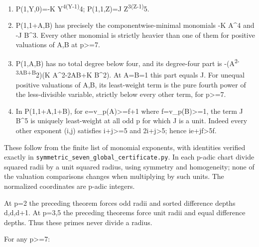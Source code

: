 \documentclass[
  10pt,
]{article}
\providecommand{\tightlist}{%
  \setlength{\itemsep}{0pt}\setlength{\parskip}{0pt}}
\begin{document}
\begin{enumerate}
\def\labelenumi{\arabic{enumi}.}
\tightlist
\item
  P(1,Y,0)=-K Y\textsuperscript{4(Y-1)}4; P(1,1,Z)=J
  Z\textsuperscript{3(Z-1)}5.
\item
  P(1,1+A,B) has precisely the componentwise-minimal monomials -K A\^{}4
  and -J B\^{}3. Every other monomial is strictly heavier than one of
  them for positive valuations of A,B at p\textgreater=7.
\item
  P(1,A,B) has no total degree below four, and its degree-four part is
  -(A\textsuperscript{2-3AB+B}2)(K A\^{}2-2AB+K B\^{}2). At A=B=1 this
  part equals J. For unequal positive valuations of A,B, its
  least-weight term is the pure fourth power of the less-divisible
  variable, strictly below every other term, for p\textgreater=7.
\item
  In P(1,1+A,1+B), for e=v\_p(A)\textgreater=f+1 where
  f=v\_p(B)\textgreater=1, the term J B\^{}5 is uniquely least-weight at
  all odd p for which J is a unit. Indeed every other exponent (i,j)
  satisfies i+j\textgreater=5 and 2i+j\textgreater5; hence
  ie+jf\textgreater5f.
\end{enumerate}

These follow from the finite list of monomial exponents, with identities
verified exactly in \texttt{symmetric\_seven\_global\_certificate.py}.
In each p-adic chart divide squared radii by a unit squared radius,
using symmetry and homogeneity; none of the valuation comparisons
changes when multiplying by such units. The normalized coordinates are
p-adic integers.

At p=2 the preceding theorem forces odd radii and sorted difference
depths d,d,d+1. At p=3,5 the preceding theorems force unit radii and
equal difference depths. Thus these primes never divide a radius.

For any p\textgreater=7:
\end{document}
